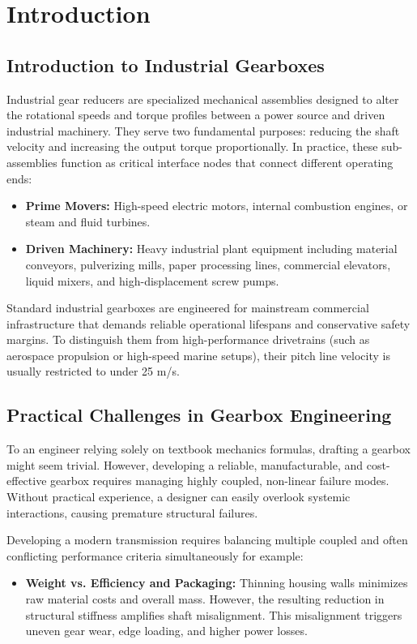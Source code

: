 \chapter{Introduction}
\section{Introduction to Industrial Gearboxes}
	Industrial gear reducers are specialized mechanical assemblies designed to alter the rotational speeds and torque profiles 
    between a power source and driven industrial machinery. They serve two fundamental purposes: reducing the shaft velocity 
    and increasing the output torque proportionally. In practice, these sub-assemblies function as critical interface 
    nodes that connect different operating ends:
		\begin{itemize}
			\item \textbf{Prime Movers:} High-speed electric motors, internal combustion engines, or steam and fluid turbines.
			\item \textbf{Driven Machinery:} Heavy industrial plant equipment including material conveyors, pulverizing mills, 
			paper processing lines, commercial elevators, liquid mixers, and high-displacement screw pumps.
		\end{itemize}
	Standard industrial gearboxes are engineered for mainstream commercial infrastructure that demands reliable operational lifespans and conservative 
	safety margins. To distinguish them from high-performance drivetrains (such as aerospace propulsion or high-speed marine setups), their pitch line 
	velocity is usually restricted to under 25 m/s.

\section{Practical Challenges in Gearbox Engineering}
	To an engineer relying solely on textbook mechanics formulas, drafting a gearbox might seem trivial. However, developing a 
    reliable, manufacturable, and cost-effective gearbox requires managing highly coupled, non-linear failure modes. 
    Without practical experience, a designer can easily overlook systemic interactions, causing premature structural failures. 

    Developing a modern transmission requires balancing multiple coupled and often conflicting performance criteria simultaneously 
    for example: 
		\begin{itemize}
			\item \textbf{Weight vs. Efficiency and Packaging:}
			Thinning housing walls minimizes raw material costs and overall mass. 
			However, the resulting reduction in structural stiffness amplifies shaft misalignment. This misalignment triggers 
			uneven gear wear, edge loading, and higher power losses.
		\end{itemize}

